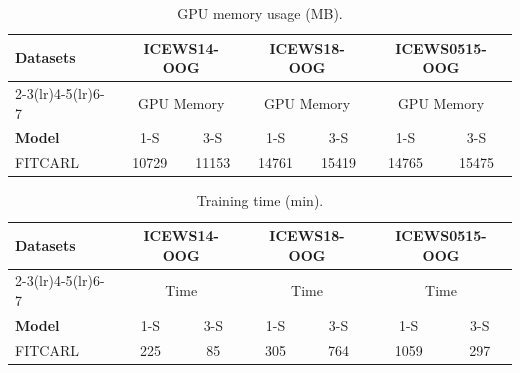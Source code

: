 \documentclass[runningheads]{llncs}
\begin{document}
\begin{table}[htbp]
\caption{GPU memory usage (MB).}
    \label{tab: memory}
      \centering
      \begin{tabular}{lcccccc} 
      \toprule %
     \multicolumn{1}{l}{\textbf{Datasets}} & \multicolumn{2}{c}{\textbf{ICEWS14-OOG}} & \multicolumn{2}{c}{\textbf{ICEWS18-OOG}} &\multicolumn{2}{c}{\textbf{ICEWS0515-OOG}} \\
      \cmidrule(lr){2-3}\cmidrule(lr){4-5}\cmidrule(lr){6-7}
       & \multicolumn{2}{c}{GPU Memory}  & \multicolumn{2}{c}{GPU Memory} & \multicolumn{2}{c}{GPU Memory}  \\
      \textbf{Model} & 1-S & 3-S & 1-S & 3-S & 1-S & 3-S\\
       \midrule
       FITCARL & 10729 & 11153 & 14761 & 15419 & 14765 & 15475 \\
       
      \bottomrule %
    \end{tabular}
        
\end{table}
\begin{table}[htbp]
\caption{Training time (min).}
    \label{tab: train time}
      \centering
      \begin{tabular}{lcccccc} 
      \toprule %
     \multicolumn{1}{l}{\textbf{Datasets}} & \multicolumn{2}{c}{\textbf{ICEWS14-OOG}} & \multicolumn{2}{c}{\textbf{ICEWS18-OOG}} &\multicolumn{2}{c}{\textbf{ICEWS0515-OOG}} \\
      \cmidrule(lr){2-3}\cmidrule(lr){4-5}\cmidrule(lr){6-7}
       & \multicolumn{2}{c}{Time}  & \multicolumn{2}{c}{Time} & \multicolumn{2}{c}{Time}  \\
      \textbf{Model} & 1-S & 3-S & 1-S & 3-S & 1-S & 3-S\\
       \midrule
       FITCARL & 225 & 85 & 305 & 764 & 1059 & 297 \\
       
      \bottomrule %
    \end{tabular}
        
\end{table}
\end{document}
